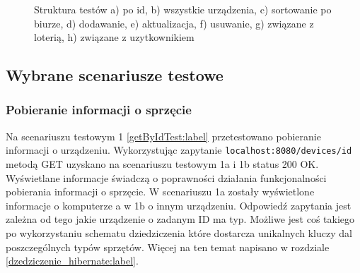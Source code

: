 \begin{figure}[htb]
\begin{tabular}{@{}llll@{}}
 
	\end{tabular}
  \caption{Struktura testów a) po id, b) wszystkie urządzenia, c) sortowanie po biurze, d) dodawanie, e) aktualizacja, f) usuwanie, g) związane z loterią, h) związane z uzytkownikiem}
  \label{postmanStruct:label}
\end{figure}
\newpage

\subsection {Wybrane scenariusze testowe}


\subsubsection{Pobieranie informacji o sprzęcie}
Na scenariuszu testowym 1 \ref{getByIdTest:label} przetestowano pobieranie informacji o urządzeniu. Wykorzystując zapytanie \texttt{localhost:8080/devices/{id}} metodą GET uzyskano na scenariuszu testowym 1a i 1b status 200 OK. Wyświetlane informacje świadczą o poprawności działania funkcjonalności pobierania informacji o sprzęcie. W scenariuszu 1a zostały wyświetlone informacje o komputerze a w 1b o innym urządzeniu. Odpowiedź zapytania jest zależna od tego jakie urządzenie o zadanym ID ma typ. Możliwe jest coś takiego po wykorzystaniu schematu dziedziczenia które dostarcza unikalnych kluczy dal poszczególnych typów sprzętów. Więcej na ten temat napisano w rozdziale \ref{dzedziczenie_hibernate:label}.


